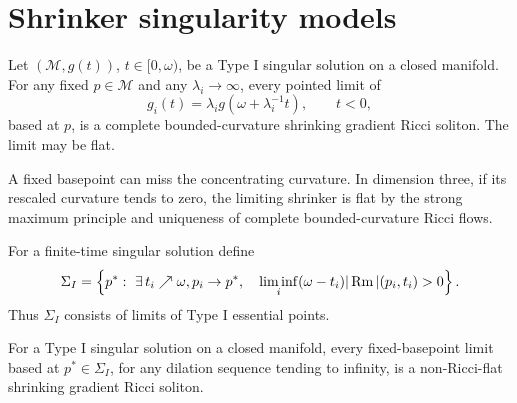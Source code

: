 \section{Shrinker singularity models}

\begin{proposition}
\label{prop:chow-iv-fixed-basepoint-type-i-limits-shrinkers}
Let \((\mathcal M,g(t))\), \(t\in[0,\omega)\), be a Type I singular
solution on a closed manifold.  For any fixed \(p\in\mathcal M\) and any
\(\lambda_i\to\infty\), every pointed limit of
\[
 g_i(t)=\lambda_i g(\omega+\lambda_i^{-1}t),\qquad t<0,
\]
based at \(p\), is a complete bounded-curvature shrinking gradient Ricci
soliton.  The limit may be flat.
\end{proposition}

\begin{remark}
\label{rem:chow-iv-flat-fixed-basepoint-type-i-limit}
A fixed basepoint can miss the concentrating curvature.  In dimension three,
if its rescaled curvature tends to zero, the limiting shrinker is flat by the
strong maximum principle and uniqueness of complete bounded-curvature Ricci
flows.
\end{remark}

\begin{definition}
\label{def:chow-iv-type-i-singular-point-set}
For a finite-time singular solution define
\[
 \Sigma_I=\left\{p^*:\ \exists\,t_i\nearrow\omega, p_i\to p^*,
 \quad\liminf_i(\omega-t_i)|\operatorname{Rm}|(p_i,t_i)>0\right\}.
\]
Thus \(\Sigma_I\) consists of limits of Type I essential points.
\end{definition}

\begin{theorem}
\label{thm:chow-iv-type-i-singular-point-limits-nonflat}
For a Type I singular solution on a closed manifold, every fixed-basepoint
limit based at \(p^*\in\Sigma_I\), for any dilation sequence tending to
infinity, is a non-Ricci-flat shrinking gradient Ricci soliton.
\end{theorem}

